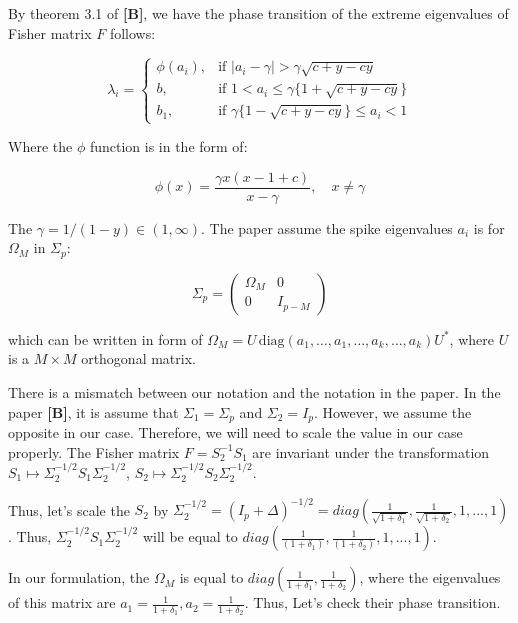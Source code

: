 \documentclass[
]{article}
\begin{document}
By theorem 3.1 of \textbf{{[}B{]}}, we have the phase transition of the
extreme eigenvalues of Fisher matrix \(F\) follows:

\[ 
\lambda_i = 
\begin{cases} 
\phi(a_i), & \text{if } |a_i - \gamma| > \gamma\sqrt{c + y - cy} \\
b, & \text{if } 1 < a_i \leq \gamma\{1 + \sqrt{c + y - cy}\} \\
b_1, & \text{if } \gamma\{1 - \sqrt{c + y - cy}\} \leq a_i < 1 
\end{cases}
\]

Where the \(\phi\) function is in the form of:

\[
\phi(x) = \frac{\gamma x (x - 1 + c)}{x - \gamma}, \quad x \neq \gamma 
\]

The \(\gamma = 1/(1 − y) \in (1, \infty)\). The paper assume the spike
eigenvalues \(a_i\) is for \(\Omega_M\) in \(\Sigma_p\):

\[
\Sigma_p = \begin{pmatrix}\Omega_M & 0 \\0 & I_{p-M}\end{pmatrix}
\]

which can be written in form of
\(\Omega_M = U \, \text{diag}(a_1, \ldots, a_1, \ldots, a_k, \ldots, a_k) U^*\),
where \(U\) is a \(M \times M\) orthogonal matrix.

There is a mismatch between our notation and the notation in the paper.
In the paper \textbf{{[}B{]}}, it is assume that \(\Sigma_1 = \Sigma_p\)
and \(\Sigma_2 = I_p\). However, we assume the opposite in our case.
Therefore, we will need to scale the value in our case properly. The
Fisher matrix \(F = S^{-1}_2 S_1\) are invariant under the
transformation \(S_1 \mapsto \Sigma^{-1/2}_2 S_1 \Sigma^{-1/2}_2\),
\(S_2 \mapsto \Sigma^{-1/2}_2 S_2 \Sigma^{-1/2}_2\).

Thus, let's scale the \(S_2\) by
\(\Sigma^{-1/2}_2 =(I_p +\Delta)^{-1/2} = diag(\frac{1}{\sqrt{1+\delta_1}}, \frac{1}{\sqrt{1+\delta_2}},1,...,1)\).
Thus, \(\Sigma^{-1/2}_2 S_1 \Sigma^{-1/2}_2\) will be equal to
\(diag(\frac{1}{(1+\delta_1)}, \frac{1}{(1+\delta_2)},1,...,1)\).

In our formulation, the \(\Omega_M\) is equal to
\(diag(\frac{1}{1 + \delta_1}, \frac{1}{1+ \delta_2})\), where the
eigenvalues of this matrix are
\(a_1 = \frac{1}{1 + \delta_1}, a_2 = \frac{1}{1+ \delta_2}\). Thus,
Let's check their phase transition.
\end{document}
